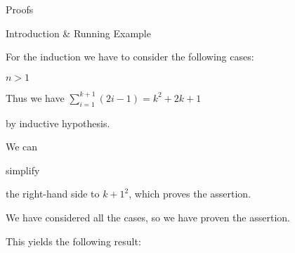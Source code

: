 \begin{sfragment}{Proofs}
\begin{sfragment}{Introduction \& Running Example}
\begin{latexcode}
\begin{sproof}[id=simple-proof]
\begin{spfcases}{For the induction we have to consider the following cases:}
\begin{spfcase}{$n>1$}
\begin{spfstep}
\begin{justification}[method=arith:split-sum]
        \end{justification}
      \end{spfstep}
      \begin{spfstep}
        Thus we have $\sum_{i=1}^{k+1}{(2i-1)}=k^2+2k+1$
        \begin{justification}[method=fertilize]
          by inductive hypothesis.
        \end{justification}
      \end{spfstep}
      \begin{spfstep}[type=conclusion]
        We can \begin{justification}[method=simplify]simplify\end{justification} 
        the right-hand side to ${k+1}^2$, which proves the assertion.
      \end{spfstep}
   \end{spfcase}
    \begin{spfstep}[type=conclusion]
      We have considered all the cases, so we have proven the assertion.
    \end{spfstep}
  \end{spfcases}
\end{sproof}
\end{latexcode}

This yields the following result: 


\end{sfragment}
\end{sfragment}

